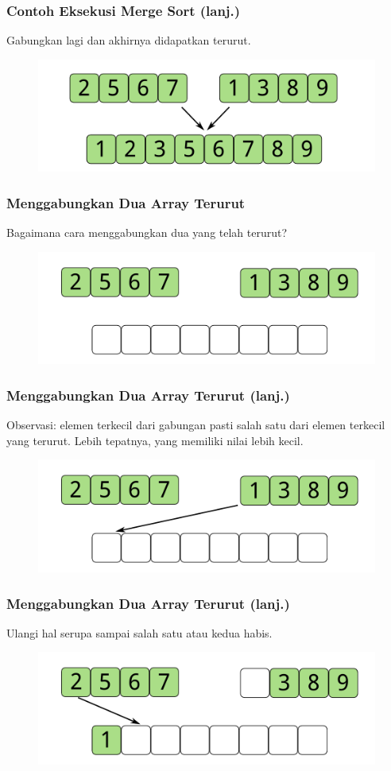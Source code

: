 \begin{frame}
\frametitle{Contoh Eksekusi Merge Sort (lanj.)}
Gabungkan lagi dan akhirnya didapatkan \farray terurut.
\begin{figure}
  \centering
  \includegraphics[width=10 cm]{asset/merge-sort-demo-7.pdf}
\end{figure}
\end{frame}

\begin{frame}
\frametitle{Menggabungkan Dua Array Terurut}
Bagaimana cara menggabungkan dua \farray yang telah terurut?
\begin{figure}
  \centering
  \includegraphics[width=10 cm]{asset/merge-array-pair-1.pdf}
\end{figure}
\end{frame}

\begin{frame}
\frametitle{Menggabungkan Dua Array Terurut (lanj.)}
Observasi: elemen terkecil dari \farray gabungan pasti salah satu dari elemen terkecil \farray yang terurut. Lebih tepatnya, yang memiliki nilai lebih kecil.
\begin{figure}
  \centering
  \includegraphics[width=10 cm]{asset/merge-array-pair-2.pdf}
\end{figure}
\end{frame}

\begin{frame}
\frametitle{Menggabungkan Dua Array Terurut (lanj.)}
Ulangi hal serupa sampai salah satu atau kedua \farray habis.

\begin{figure}
  \centering
  \includegraphics[width=10 cm]{asset/merge-array-pair-3.pdf}
\end{figure}
\end{frame}

